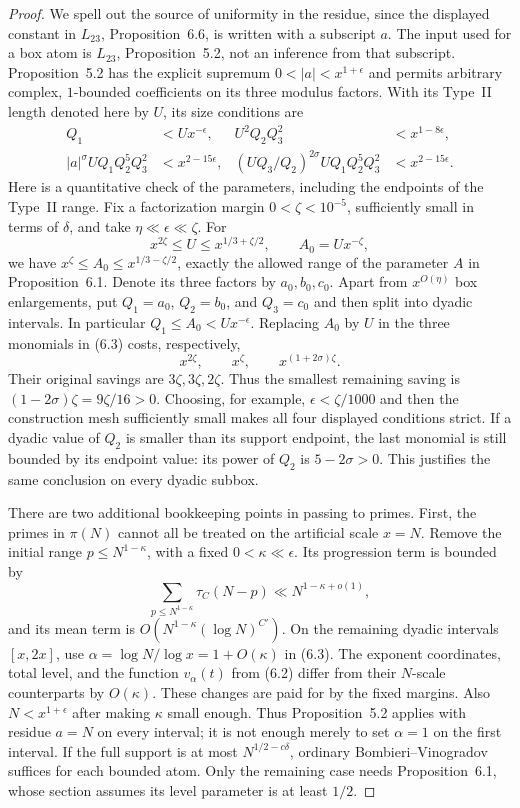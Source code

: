 \documentclass[11pt]{article}
\begin{document}
\begin{proof}
We spell out the source of uniformity in the residue, since the
displayed constant in $L_{23}$, Proposition~6.6, is written with
a subscript $a$. The input used for a box atom is $L_{23}$,
Proposition~5.2, not an inference from that subscript. Proposition~5.2
has the explicit supremum $0<|a|<x^{1+\epsilon}$ and permits arbitrary
complex, $1$-bounded coefficients on its three modulus factors.
With its Type~II length denoted here by $U$, its size conditions are
\begin{align*}
 Q_1&<Ux^{-\epsilon},&
 U^2Q_2Q_3^2&<x^{1-8\epsilon},\\
 |a|^\sigma UQ_1Q_2^5Q_3^2&<x^{2-15\epsilon},&
 (UQ_3/Q_2)^{2\sigma}UQ_1Q_2^5Q_3^2
     &<x^{2-15\epsilon}.
\end{align*}
Here is a quantitative check of the parameters, including the
endpoints of the Type~II range. Fix a factorization margin
$0<\zeta<10^{-5}$, sufficiently small in terms of $\delta$, and take
$\eta\ll\epsilon\ll\zeta$. For
\[
 x^{2\zeta}\le U\le x^{1/3+\zeta/2},\qquad A_0=Ux^{-\zeta},
\]
we have $x^\zeta\le A_0\le x^{1/3-\zeta/2}$, exactly the allowed
range of the parameter $A$ in Proposition~6.1. Denote its three
factors by $a_0,b_0,c_0$. Apart from $x^{O(\eta)}$ box enlargements,
put $Q_1=a_0$, $Q_2=b_0$, and $Q_3=c_0$ and then split into dyadic
intervals. In particular $Q_1\le A_0<Ux^{-\epsilon}$.
Replacing $A_0$ by $U$ in the three monomials in (6.3) costs,
respectively,
\[
 x^{2\zeta},\qquad x^\zeta,\qquad
 x^{(1+2\sigma)\zeta}.
\]
Their original savings are $3\zeta,3\zeta,2\zeta$.
Thus the smallest remaining saving is
$(1-2\sigma)\zeta=9\zeta/16>0$.
Choosing, for example, $\epsilon<\zeta/1000$ and then the construction
mesh sufficiently small makes all four displayed conditions strict.
If a dyadic value of $Q_2$ is smaller than its support endpoint,
the last monomial is still bounded by its endpoint value: its power
of $Q_2$ is $5-2\sigma>0$. This justifies the same conclusion on
every dyadic subbox.

There are two additional bookkeeping points in passing to primes.
First, the primes in $\pi(N)$ cannot all be treated on the artificial
scale $x=N$. Remove the initial range $p\le N^{1-\kappa}$, with a
fixed $0<\kappa\ll\epsilon$. Its progression term is bounded by
\[
 \sum_{p\le N^{1-\kappa}}\tau_C(N-p)
       \ll N^{1-\kappa+o(1)},
\]
and its mean term is $O(N^{1-\kappa}(\log N)^{C'})$.
On the remaining dyadic intervals $[x,2x]$, use
$\alpha=\log N/\log x=1+O(\kappa)$ in (6.3).
The exponent coordinates, total level, and the function
$v_\alpha(t)$ from (6.2) differ from their $N$-scale counterparts
by $O(\kappa)$. These changes are paid for by the fixed margins.
Also $N<x^{1+\epsilon}$ after making $\kappa$ small enough.
Thus Proposition~5.2 applies with residue $a=N$ on every interval;
it is not enough merely to set $\alpha=1$ on the first interval.
If the full support is at most $N^{1/2-c\delta}$, ordinary
Bombieri--Vinogradov suffices for each bounded atom. Only the
remaining case needs Proposition~6.1, whose section assumes its
level parameter is at least $1/2$.


\end{proof}
\end{document}
